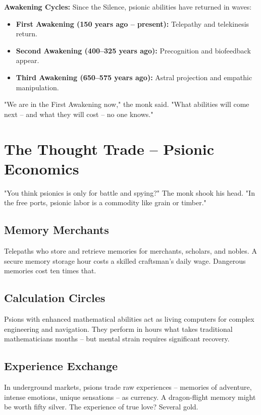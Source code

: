 \documentclass[10pt,a5paper]{book}
\begin{document}
\textbf{Awakening Cycles:} Since the Silence, psionic abilities have returned in waves:
\begin{itemize}
    \item \textbf{First Awakening (150 years ago -- present):} Telepathy and telekinesis return.
    \item \textbf{Second Awakening (400--325 years ago):} Precognition and biofeedback appear.
    \item \textbf{Third Awakening (650--575 years ago):} Astral projection and empathic manipulation.
\end{itemize}

"We are in the First Awakening now," the monk said. "What abilities will come next -- and what they will cost -- no one knows."

\section{The Thought Trade -- Psionic Economics}

"You think psionics is only for battle and spying?" The monk shook his head. "In the free ports, psionic labor is a commodity like grain or timber."

\subsection{Memory Merchants}
Telepaths who store and retrieve memories for merchants, scholars, and nobles. A secure memory storage hour costs a skilled craftsman's daily wage. Dangerous memories cost ten times that.

\subsection{Calculation Circles}
Psions with enhanced mathematical abilities act as living computers for complex engineering and navigation. They perform in hours what takes traditional mathematicians months -- but mental strain requires significant recovery.

\subsection{Experience Exchange}
In underground markets, psions trade raw experiences -- memories of adventure, intense emotions, unique sensations -- as currency. A dragon-flight memory might be worth fifty silver. The experience of true love? Several gold.
\end{document}
